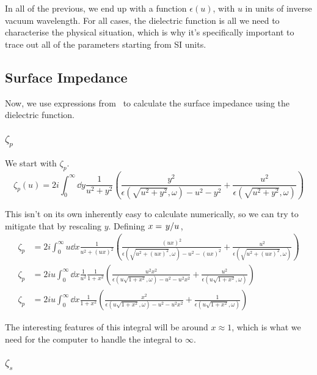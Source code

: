 \documentclass[../main.tex]{subfiles}
\begin{document}
	In all of the previous, we end up with a function $\epsilon(u)$, with $u$ in units of inverse vacuum wavelength.
	For all cases, the dielectric function is all we need to characterise the physical situation, which is why it's specifically important to trace out all of the parameters starting from SI units.

	\subsection{Surface Impedance} \label{subsec:nce:surfaceimpedance}
	Now, we use expressions from~\cite{Ford1984} to calculate the surface impedance using the dielectric function.

	\subsubsection{$\zeta_p$}
	We start with $\zeta_p$.
	\begin{equation}
		\zeta_p(u) = 2i \int_0^\infty \dd{y} \frac{1}{u^2 + y^2} \left( \frac{y^2}{\epsilon(\sqrt{u^2 + y^2}, \omega) - u^2 - y^2} + \frac{u^2}{\epsilon(\sqrt{u^2 + y^2}, \omega)} \right)
	\end{equation}

	This isn't on its own inherently easy to calculate numerically, so we can try to mitigate that by rescaling $y$.
	Defining $x = \flatfrac{y}{u}$,
	\begin{align}
		\zeta_p &= 2i \int_0^\infty u \dd{x} \frac{1}{u^2 + (u x)^2} \left( \frac{(u x)^2}{\epsilon(\sqrt{u^2 + (u x)^2}, \omega) - u^2 - (u x)^2} + \frac{u^2}{\epsilon(\sqrt{u^2 + (u x)^2}, \omega)} \right) \\
		\zeta_p &= 2i u \int_0^\infty \dd{x} \frac{1}{u^2} \frac{1}{1 + x^2} \left( \frac{u^2 x^2}{\epsilon(u \sqrt{1 + x^2}, \omega) - u^2 - u^2 x^2} + \frac{u^2}{\epsilon(u \sqrt{1 + x^2}, \omega)} \right) \\
		\zeta_p &= 2i u \int_0^\infty \dd{x} \frac{1}{1 + x^2} \left( \frac{x^2}{\epsilon(u \sqrt{1 + x^2}, \omega) - u^2 - u^2 x^2} + \frac{1}{\epsilon(u \sqrt{1 + x^2}, \omega)} \right)
	\end{align}

	The interesting features of this integral will be around $x \approx 1$, which is what we need for the computer to handle the integral to $\infty$.

	\subsubsection{$\zeta_s$}
\end{document}
